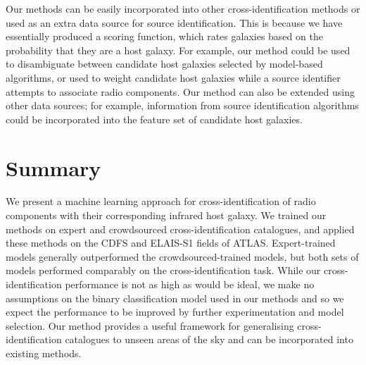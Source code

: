 \documentclass[fleqn,usenatbib,usedcolumn]{mnras}
\begin{document}
    Our methods can be easily incorporated into other cross-identification
    methods or used as an extra data source for source identification. This is
    because we have essentially produced a scoring function, which rates
    galaxies based on the probability that they are a host galaxy. For
    example, our method could be used to disambiguate between candidate host
    galaxies selected by model-based algorithms, or used to weight candidate
    host galaxies while a source identifier attempts to associate radio
    components. Our method can also be extended using other data sources; for
    example, information from source identification algorithms could be
    incorporated into the feature set of candidate host galaxies.

\section{Summary}

  We present a machine learning approach for cross-identification of radio
  components with their corresponding infrared host galaxy. We trained our
  methods on expert and crowdsourced cross-identification catalogues, and
  applied these methods on the CDFS and ELAIS-S1 fields of ATLAS.
  Expert-trained models generally outperformed the crowdsourced-trained
  models, but both sets of models performed comparably on the
  cross-identification task. While our cross-identification performance is not
  as high as would be ideal, we make no assumptions on the binary
  classification model used in our methods and so we expect the performance to
  be improved by further experimentation and model selection. Our method
  provides a useful framework for generalising cross-identification catalogues
  to unseen areas of the sky and can be incorporated into existing methods.

%



\clearpage
\appendix
\end{document}
